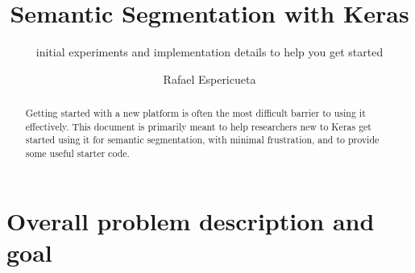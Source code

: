 \title{Semantic Segmentation with Keras}

\subtitle{initial experiments and implementation details to help you get started}


\repdate{\today}


%
\author[ICG]{Rafael Espericueta}


%
\newcommand{\TUGn}{Graz University of Technology}
\address[ICG]{Inst. of Computer Graphics and Vision \\ \TUGn, Austria}


%



 
\begin{abstract}
Getting started with a new platform is often the most difficult barrier
to using it effectively. This document is primarily meant to help researchers  
new to Keras get started using it for semantic segmentation, with minimal
frustration, and to provide some useful starter code.
\end{abstract}








\section{Overall problem description and goal}

